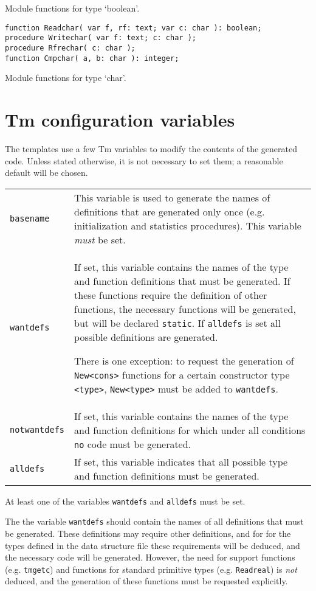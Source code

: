 \documentclass{article}
\makeatletter
\newcommand{\Tm}{\sf Tm}
\newenvironment{desc}{\nopagebreak\vspace{-\bigskipamount}\vspace{-\parskip}\begin{list}{}{\setlength{\topsep}{0pt}\setlength{\rightmargin}{0pt}}\item[]}{\end{list}}
\newlength{\descwidth}
\newenvironment{desctab}{\begin{tabular*}{\textwidth}{l@{\extracolsep{\fill}}p{\descwidth}}}{\end{tabular*}}
\makeatother
\begin{document}
\begin{desc}
Module functions for type `boolean'.
\end{desc}
\begin{verbatim}
function Readchar( var f, rf: text; var c: char ): boolean;
procedure Writechar( var f: text; c: char );
procedure Rfrechar( c: char );
function Cmpchar( a, b: char ): integer;
\end{verbatim}
\begin{desc}
Module functions for type `char'.
\end{desc}
\section{Tm configuration variables}
\label{s.pasconfig}
The templates use a few {\Tm} variables to modify the contents
of the generated code.
Unless stated otherwise,
it is not necessary to set them;
a reasonable default will be chosen.
\par
\begin{desctab}
{\tt basename}
&
This variable is used to generate the names of 
definitions that are generated only once
(e.g. initialization and statistics procedures).
This variable
{\em must}
be set.
\\
{\tt wantdefs}\index{wantdefs@{\tt wantdefs}}
&
If set,
this variable contains the names of the type and function definitions that
must be generated.
If these functions require the definition of other functions,
the necessary functions will be generated,
but will be declared {\tt static}.
If {\tt alldefs} is set all possible definitions are generated.
\par
There is one exception:
to request the generation of {\tt New<cons>} functions for a certain
constructor type {\tt <type>},
{\tt New<type>} must be added to {\tt wantdefs}.
\\
{\tt notwantdefs}\index{notwantdefs@{\tt notwantdefs}}
&
If set,
this variable contains the names of the type and function definitions for
which under all conditions {\tt no} code must be generated.
\\
{\tt alldefs}\index{alldefs@{\tt alldefs}}
&
If set,
this variable indicates that all possible type and function definitions must
be generated.
\end{desctab}
\par
At least one of the variables {\tt wantdefs} and {\tt alldefs} must be set.
\par
The the variable {\tt wantdefs} should contain the names of all definitions
that must be generated.
These definitions may require other definitions,
and for for the types defined in the data structure file
these requirements will be deduced,
and the necessary code will be generated.
However,
the need for support functions (e.g. {\tt tmgetc}) and functions for standard
primitive types (e.g. {\tt Readreal}) is {\em not} deduced,
and the generation of these functions must be requested explicitly.
\end{document}
